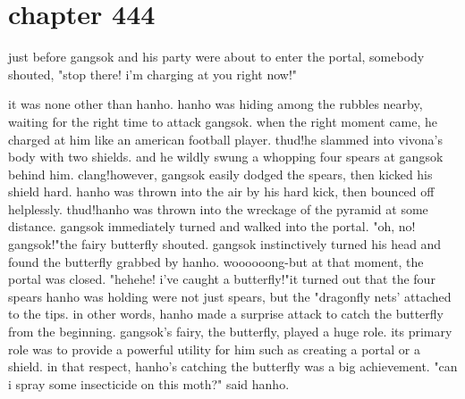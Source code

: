 \section{chapter 444}

just before gangsok and his party were about to enter the portal, somebody shouted, "stop there! i'm charging at you right now!"




it was none other than hanho.
hanho was hiding among the rubbles nearby, waiting for the right time to attack gangsok.
 when the right moment came, he charged at him like an american football player.
thud!he slammed into vivona's body with two shields.
 and he wildly swung a whopping four spears at gangsok behind him.
clang!however, gangsok easily dodged the spears, then kicked his shield hard.
hanho was thrown into the air by his hard kick, then bounced off helplessly.
 thud!hanho was thrown into the wreckage of the pyramid at some distance.
 gangsok immediately turned and walked into the portal.
"oh, no! gangsok!"the fairy butterfly shouted.
 gangsok instinctively turned his head and found the butterfly grabbed by hanho.
woooooong-but at that moment, the portal was closed.
"hehehe! i've caught a butterfly!"it turned out that the four spears hanho was holding were not just spears, but the "dragonfly nets' attached to the tips.
 in other words, hanho made a surprise attack to catch the butterfly from the beginning.
gangsok's fairy, the butterfly, played a huge role.
 its primary role was to provide a powerful utility for him such as creating a portal or a shield.
 in that respect, hanho's catching the butterfly was a big achievement.
 "can i spray some insecticide on this moth?" said hanho.

